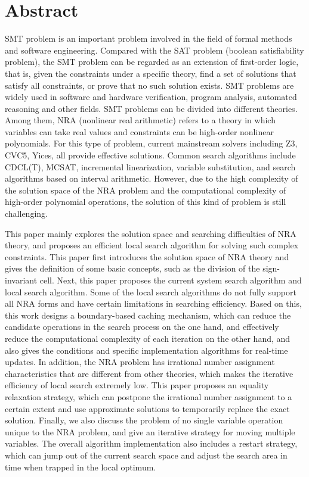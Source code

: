 \intobmk\chapter*{Abstract}%

SMT problem is an important problem involved in the field of formal methods and software engineering. Compared with the SAT problem (boolean satisfiability problem), the SMT problem can be regarded as an extension of first-order logic, that is, given the constraints under a specific theory, find a set of solutions that satisfy all constraints, or prove that no such solution exists. SMT problems are widely used in software and hardware verification, program analysis, automated reasoning and other fields. SMT problems can be divided into different theories. Among them, NRA (nonlinear real arithmetic) refers to a theory in which variables can take real values ​​and constraints can be high-order nonlinear polynomials. For this type of problem, current mainstream solvers including Z3, CVC5, Yices, all provide effective solutions. Common search algorithms include CDCL(T), MCSAT, incremental linearization, variable substitution, and search algorithms based on interval arithmetic. However, due to the high complexity of the solution space of the NRA problem and the computational complexity of high-order polynomial operations, the solution of this kind of problem is still challenging.

This paper mainly explores the solution space and searching difficulties of NRA theory, and proposes an efficient local search algorithm for solving such complex constraints. This paper first introduces the solution space of NRA theory and gives the definition of some basic concepts, such as the division of the sign-invariant cell. Next, this paper proposes the current system search algorithm and local search algorithm. Some of the local search algorithms do not fully support all NRA forms and have certain limitations in searching efficiency. Based on this, this work designs a boundary-based caching mechanism, which can reduce the candidate operations in the search process on the one hand, and effectively reduce the computational complexity of each iteration on the other hand, and also gives the conditions and specific implementation algorithms for real-time updates. In addition, the NRA problem has irrational number assignment characteristics that are different from other theories, which makes the iterative efficiency of local search extremely low. This paper proposes an equality relaxation strategy, which can postpone the irrational number assignment to a certain extent and use approximate solutions to temporarily replace the exact solution. Finally, we also discuss the problem of no single variable operation unique to the NRA problem, and give an iterative strategy for moving multiple variables. The overall algorithm implementation also includes a restart strategy, which can jump out of the current search space and adjust the search area in time when trapped in the local optimum.

